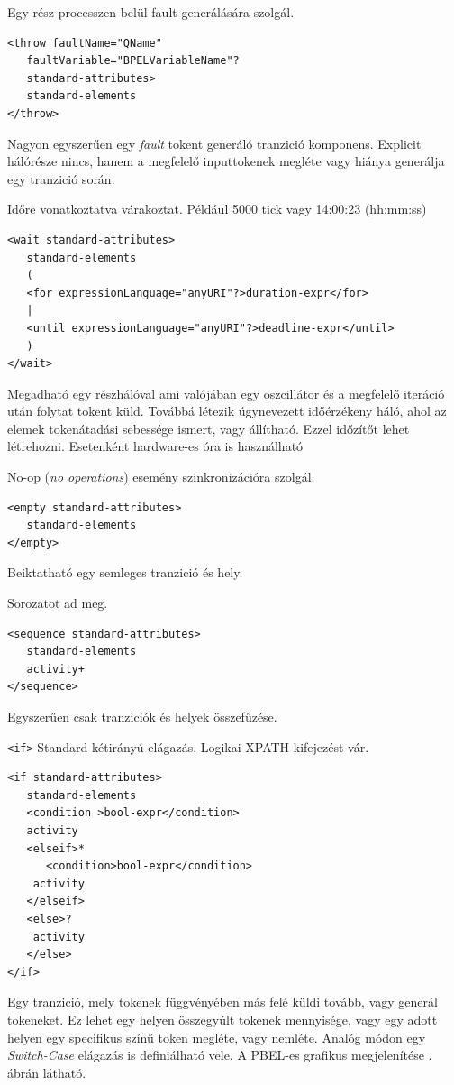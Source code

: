 Egy rész processzen belül fault generálására szolgál. 
\begin{verbatim}
<throw faultName="QName"
   faultVariable="BPELVariableName"?
   standard-attributes>
   standard-elements
</throw>
\end{verbatim}
Nagyon egyszerűen egy \textit{fault} tokent generáló tranzició komponens. Explicit hálórésze nincs, hanem a megfelelő inputtokenek megléte vagy hiánya generálja egy tranzició során. 

Időre vonatkoztatva várakoztat. Például 5000 tick vagy 14:00:23 (hh:mm:ss)
\begin{verbatim} 
<wait standard-attributes>
   standard-elements
   (
   <for expressionLanguage="anyURI"?>duration-expr</for>
   |
   <until expressionLanguage="anyURI"?>deadline-expr</until>
   )
</wait>
\end{verbatim}
Megadható egy részhálóval ami valójában egy oszcillátor és a megfelelő iteráció után folytat tokent küld. Továbbá létezik úgynevezett időérzékeny háló, ahol az elemek tokenátadási sebessége ismert, vagy állítható. Ezzel időzítőt lehet létrehozni. Esetenként hardware-es óra is használható

No-op (\textit{no operations}) esemény szinkronizációra szolgál.
\begin{verbatim}
<empty standard-attributes>
   standard-elements
</empty>
\end{verbatim}
Beiktatható egy semleges tranzició és hely.

Sorozatot ad meg.
\begin{verbatim}
<sequence standard-attributes>
   standard-elements
   activity+
</sequence>
\end{verbatim}
Egyszerűen csak tranziciók és helyek összefűzése. 


\texttt{<if>} Standard kétirányú elágazás. Logikai XPATH kifejezést vár. 
\begin{verbatim}
<if standard-attributes>
   standard-elements
   <condition >bool-expr</condition>
   activity
   <elseif>*
      <condition>bool-expr</condition>
  	activity
   </elseif>
   <else>?
  	activity
   </else>
</if>
\end{verbatim}
Egy tranzició, mely tokenek függvényében más felé küldi tovább, vagy generál tokeneket. Ez lehet egy helyen összegyúlt tokenek mennyisége, vagy egy adott helyen egy specifikus színű token megléte, vagy nemléte. Analóg módon egy \textit{Switch-Case} elágazás is definiálható vele.
A PBEL-es grafikus megjelenítése . ábrán látható.

